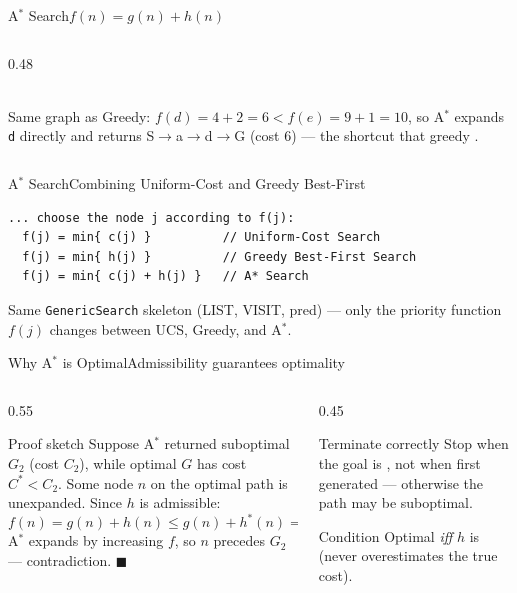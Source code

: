 \documentclass[aspectratio=169,11pt]{beamer}
\begin{document}
\begin{frame}{A$^\ast$ Search}{$f(n) = g(n) + h(n)$}
\begin{columns}[T]
\begin{column}{0.48\textwidth}
\begin{center}
{}\\
      \scriptsize Same graph as Greedy: $f(d){=}4{+}2{=}6 < f(e){=}9{+}1{=}10$, so
      A$^\ast$ expands \texttt{d} directly and returns S$\to$a$\to$d$\to$G
      (cost $6$) — the shortcut that greedy .
      \end{center}
    \end{column}
  \end{columns}
\end{frame}

\begin{frame}[fragile]{A$^\ast$ Search}{Combining Uniform-Cost and Greedy Best-First}
\begin{lstlisting}[language={}, basicstyle=\ttfamily\scriptsize, numbers=none,
                   xleftmargin=0.5em, framexleftmargin=0.5em]
... choose the node j according to f(j):
  f(j) = min{ c(j) }          // Uniform-Cost Search
  f(j) = min{ h(j) }          // Greedy Best-First Search
  f(j) = min{ c(j) + h(j) }   // A* Search
\end{lstlisting}
\centering\scriptsize
Same \texttt{GenericSearch} skeleton (LIST, VISIT, pred) — only the
priority function $f(j)$ changes between UCS, Greedy, and A$^\ast$.
\end{frame}

\begin{frame}{Why A$^\ast$ is Optimal}{Admissibility guarantees optimality}
  \begin{columns}[T]
    \begin{column}{0.55\textwidth}
      \begin{block}{Proof sketch}
        \small
        Suppose A$^\ast$ returned suboptimal $G_2$ (cost $C_2$), while optimal $G$
        has cost $C^{\ast} < C_2$. Some node $n$ on the optimal path is unexpanded.
        Since $h$ is admissible:
        \[ f(n) = g(n)+h(n) \le g(n)+h^{\ast}(n) = C^{\ast} < C_2 = f(G_2). \]
        A$^\ast$ expands by increasing $f$, so $n$ precedes $G_2$ — contradiction. $\blacksquare$
      \end{block}
    \end{column}
    \begin{column}{0.45\textwidth}
      \begin{alertblock}{Terminate correctly}
        \small Stop when the goal is ,
        not when first generated — otherwise the path may be suboptimal.
      \end{alertblock}
      \begin{block}{Condition}
        \small Optimal \emph{iff} $h$ is 
        (never overestimates the true cost).
      \end{block}
    \end{column}
  \end{columns}
\end{frame}
\end{document}
